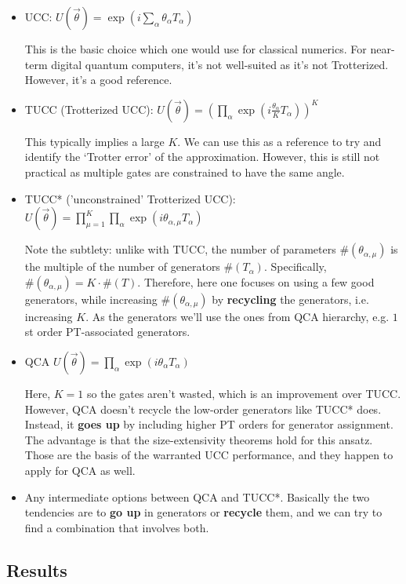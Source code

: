 \documentclass[10pt, a4paper]{article}
\begin{document}
\begin{itemize}
\item UCC: $U(\vec{\theta})=\exp(i\sum_{\alpha}\theta_{\alpha}T_\alpha)$

This is the basic choice which one would use for classical numerics. For near-term digital quantum computers, it's not well-suited as it's not Trotterized. However, it's a good reference.
\item TUCC (Trotterized UCC): $U(\vec{\theta})=(\prod_{\alpha}\exp(i\frac{\theta_{\alpha}}{K}T_\alpha))^K$

This typically implies a large $K$. We can use this as a reference to try and identify the `Trotter error' of the approximation. However, this is still not practical as multiple gates are constrained to have the same angle. 
\item TUCC* ('unconstrained' Trotterized UCC): $U(\vec{\theta})=\prod^K_{\mu=1}\prod_{\alpha}\exp(i\theta_{\alpha,\mu}T_\alpha)$

Note the subtlety: unlike with TUCC, the number of parameters $\#(\theta_{\alpha,\mu})$ is the multiple of the number of generators $\#(T_\alpha)$. Specifically, $\#(\theta_{\alpha,\mu})=K\cdot\#(T)$. Therefore, here one focuses on using a few good generators, while increasing $\#(\theta_{\alpha,\mu})$ by \textbf{recycling} the generators, i.e. increasing $K$. As the generators we'll use the ones from QCA hierarchy, e.g. $1$st order PT-associated generators.

\item QCA $U(\vec{\theta})=\prod_{\alpha}\exp(i\theta_{\alpha}T_\alpha)$

Here, $K=1$ so the gates aren't wasted, which is an improvement over TUCC. However, QCA doesn't recycle the low-order generators like TUCC* does. Instead, it \textbf{goes up} by including higher PT orders for generator assignment. The advantage is that the size-extensivity theorems hold for this ansatz. Those are the basis of the warranted UCC performance, and they happen to apply for QCA as well.

\item Any intermediate options between QCA and TUCC*. Basically the two tendencies are to \textbf{go up} in generators or \textbf{recycle} them, and we can try to find a combination that involves both.
\end{itemize}

\subsection*{Results}
\end{document}
